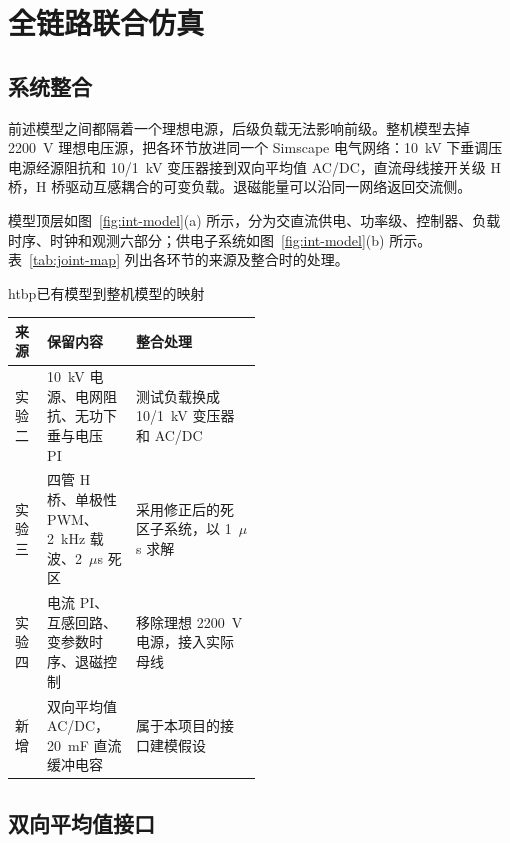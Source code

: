 
\chapter{全链路联合仿真}
\label{chap:joint}

\section{系统整合}

前述模型之间都隔着一个理想电源，后级负载无法影响前级。整机模型去掉 2200~V 理想电压源，把各环节放进同一个 Simscape 电气网络：10~kV 下垂调压电源经源阻抗和 10/1~kV 变压器接到双向平均值 AC/DC，直流母线接开关级 H 桥，H 桥驱动互感耦合的可变负载。退磁能量可以沿同一网络返回交流侧。

模型顶层如图~\ref{fig:int-model}(a) 所示，分为交直流供电、功率级、控制器、负载时序、时钟和观测六部分；供电子系统如图~\ref{fig:int-model}(b) 所示。表~\ref{tab:joint-map} 列出各环节的来源及整合时的处理。


\begin{dtable}{htbp}{已有模型到整机模型的映射}
\label{tab:joint-map}
\begin{tabularx}{\linewidth}{P{0.13\linewidth}P{0.36\linewidth}L}
\toprule
\headrow 来源 & 保留内容 & 整合处理 \\
\midrule
实验二 & 10~kV 电源、电网阻抗、无功下垂与电压 PI & 测试负载换成 10/1~kV 变压器和 AC/DC \\
实验三 & 四管 H 桥、单极性 PWM、2~kHz 载波、2~$\mu$s 死区 & 采用修正后的死区子系统，以 1~$\mu$s 求解 \\
实验四 & 电流 PI、互感回路、变参数时序、退磁控制 & 移除理想 2200~V 电源，接入实际母线 \\
新增 & 双向平均值 AC/DC，20~mF 直流缓冲电容 & 属于本项目的接口建模假设 \\
\bottomrule
\end{tabularx}
\end{dtable}

\section{双向平均值接口}

